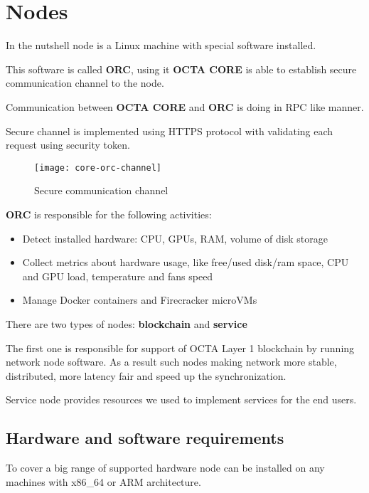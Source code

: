 \section{Nodes}

In the nutshell node is a Linux machine with special software installed.

This software is called \textbf{ORC}, using it \textbf{OCTA CORE} is able to establish secure communication channel to the node.

Communication between \textbf{OCTA CORE} and \textbf{ORC} is doing in RPC\cite{rpc} like manner.

Secure channel is implemented using HTTPS\cite{https} protocol with validating each request using security token.

\begin{figure}[H]
    \centering
    \texttt{[image: core-orc-channel]}
    \caption{Secure communication channel}
\end{figure}

\textbf{ORC} is responsible for the following activities:

\begin{itemize}
    \item Detect installed hardware: CPU, GPUs, RAM, volume of disk storage
    \item Collect metrics about hardware usage, like free/used disk/ram space, CPU and GPU load, temperature and fans speed
    \item Manage Docker\cite{docker} containers and Firecracker\cite{firecracker} microVMs
\end{itemize}

There are two types of nodes: \textbf{blockchain} and \textbf{service}

The first one is responsible for support of OCTA Layer 1 blockchain by running network node software.
As a result such nodes making network more stable, distributed, more latency fair and speed up the synchronization.

Service node provides resources we used to implement services for the end users.

\subsection{Hardware and software requirements}

To cover a big range of supported hardware node can be installed on any machines with x86\_64\cite{x86_64} or ARM\cite{arm} architecture.

